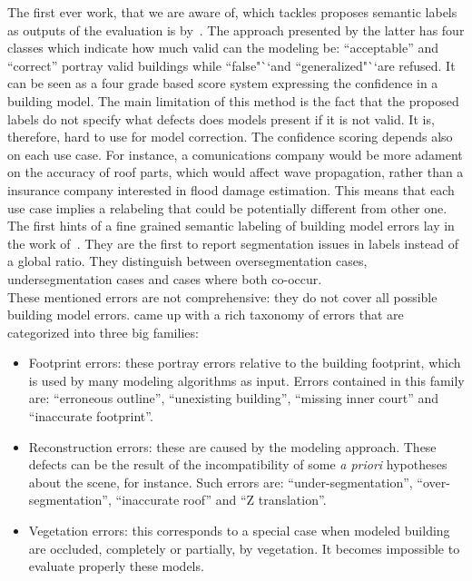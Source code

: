             The first ever work, that we are aware of, which tackles proposes semantic labels as outputs of the evaluation is by~\textcite{boudet2006supervised}.
            The approach presented by the latter has four classes which indicate how much valid can the modeling be: ``acceptable'' and ``correct'' portray valid buildings while ``false"``and ``generalized"``are refused.
            It can be seen as a four grade based score system expressing the confidence in a building model.
            The main limitation of this method is the fact that the proposed labels do not specify what defects does models present if it is not valid.
            It is, therefore, hard to use for model correction.
            The confidence scoring depends also on each use case.
            For instance, a comunications company would be more adament on the accuracy of roof parts, which would affect wave propagation, rather than a insurance company interested in flood damage estimation.
            This means that each use case implies a relabeling that could be potentially different from other one.\\
            The first hints of a fine grained semantic labeling of building model errors lay in the work of~\textcite{rottensteiner2014results}.
            They are the first to report segmentation issues in labels instead of a global ratio.
            They distinguish between oversegmentation cases, undersegmentation cases and cases where both co-occur.\\
            These mentioned errors are not comprehensive: they do not cover all possible building model errors.
            \textcite{michelin2013quality} came up with a rich taxonomy of errors that are categorized into three big families:
            \begin{itemize}
                \item Footprint errors: these portray errors relative to the building footprint, which is used by many modeling algorithms as input.
                        Errors contained in this family are: ``erroneous outline'', ``unexisting building'', ``missing inner court'' and ``inaccurate footprint''.
                \item Reconstruction errors: these are caused by the modeling approach.
                        These defects can be the result of the incompatibility of some \textit{a priori} hypotheses about the scene, for instance.
                        Such errors are: ``under-segmentation'', ``over-segmentation'', ``inaccurate roof'' and ``Z translation''.
                \item Vegetation errors: this corresponds to a special case when modeled building are occluded, completely or partially, by vegetation.
                        It becomes impossible to evaluate properly these models.
            \end{itemize}
